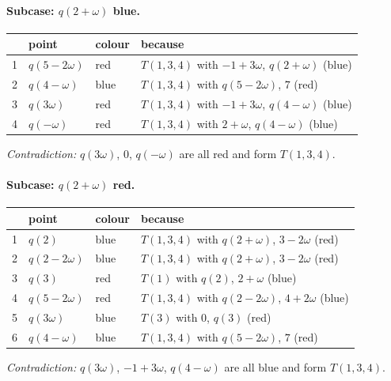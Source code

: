 \paragraph{Subcase: $q(2+\omega)$ blue.}
\begin{center}\small\begin{longtable}{rlll}\toprule & point & colour & because\\\midrule\endhead
1 & $q(5-2\omega)$ & red & $T(1,3,4)$ with $-1+3\omega$, $q(2+\omega)$ (blue)\\
2 & $q(4-\omega)$ & blue & $T(1,3,4)$ with $q(5-2\omega)$, $7$ (red)\\
3 & $q(3\omega)$ & red & $T(1,3,4)$ with $-1+3\omega$, $q(4-\omega)$ (blue)\\
4 & $q(-\omega)$ & red & $T(1,3,4)$ with $2+\omega$, $q(4-\omega)$ (blue)\\
\bottomrule\end{longtable}\end{center}
\noindent\emph{Contradiction:} $q(3\omega)$, $0$, $q(-\omega)$ are all red and form $T(1,3,4)$.\par\medskip
\paragraph{Subcase: $q(2+\omega)$ red.}
\begin{center}\small\begin{longtable}{rlll}\toprule & point & colour & because\\\midrule\endhead
1 & $q(2)$ & blue & $T(1,3,4)$ with $q(2+\omega)$, $3-2\omega$ (red)\\
2 & $q(2-2\omega)$ & blue & $T(1,3,4)$ with $q(2+\omega)$, $3-2\omega$ (red)\\
3 & $q(3)$ & red & $T(1)$ with $q(2)$, $2+\omega$ (blue)\\
4 & $q(5-2\omega)$ & red & $T(1,3,4)$ with $q(2-2\omega)$, $4+2\omega$ (blue)\\
5 & $q(3\omega)$ & blue & $T(3)$ with $0$, $q(3)$ (red)\\
6 & $q(4-\omega)$ & blue & $T(1,3,4)$ with $q(5-2\omega)$, $7$ (red)\\
\bottomrule\end{longtable}\end{center}
\noindent\emph{Contradiction:} $q(3\omega)$, $-1+3\omega$, $q(4-\omega)$ are all blue and form $T(1,3,4)$.\par\medskip
